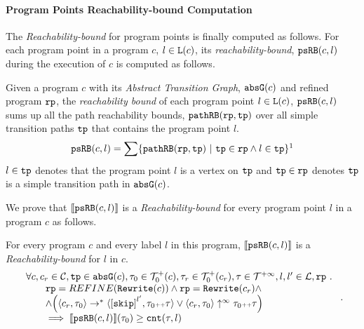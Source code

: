 \paragraph{Program Points Reachability-bound Computation}
\label{sec:point-psrb}
The \emph{Reachability-bound} for program points is finally computed as follows.
For each program point in a program $c$, $l \in \mathtt{L}(c)$,
its \emph{reachability-bound}, $\mathtt{psRB}(c, l)$ during the execution of $c$ is computed as follows.
%
\begin{defn}
\label{def:point_psrb}
Given a program $c$ with its \emph{Abstract Transition Graph}, $\mathtt{abs}{\mathtt{G}}(c)$ and refined program $\mathtt{rp}$,
the \emph{reachability bound} of each program point $l \in \mathtt{L}(c)$, $\mathtt{psRB}(c, l)$ 
sums up all the path reachability bounds, $\mathtt{pathRB}(\mathtt{rp}, \mathtt{tp})$ over all simple transition paths $\mathtt{tp}$ that contains the program point $l$.
\[ 
  \psRB(c, l) = 
  \sum
  \left\{ \inoutB(\rprog, \tpath) ~\vert~ \tpath \in \rprog \land 
  l \in \tpath \right\}\footnotemark
\]
$l \in \mathtt{tp}$ denotes that the program point $l$ is a vertex on $\mathtt{tp}$ 
and $\mathtt{tp} \in \mathtt{rp}$ denotes $\mathtt{tp}$ is a simple transition path in $\mathtt{abs}{\mathtt{G}}(c)$.
\end{defn}
We prove that $\llbracket \mathtt{psRB}(c, l) \rrbracket$ is a \emph{Reachability-bound} for every program point $l$ in a program $c$ as follows.
\begin{thm}
\label{thm:pathsensitive_rb_soundness}
For every program ${c}$ and every label $l$ in this program,
$\llbracket \mathtt{psRB}(c, l) \rrbracket$ is a \emph{Reachability-bound} for $l$ in $c$.
%
\[
  \begin{array}{l}
    \forall c, c_r \in \cdom, \tpath \in \absG(c), \trace_0 \in \ftdom_0(c),  \trace_r \in \ftdom_0(c_r), \trace \in \tdom, l, l' \in \ldom, \rprog \st 
    \\ \qquad
    \rprog = REFINE(\algrewrite(c))
    \land 
    \rprog = \algrewrite(c_r)
    \land
    \\ \qquad
    \land
    \Big(
    \config{c_r, \trace_0} \rightarrow^* \config{\clabel{\eskip}^{l'}, \trace_0 \tracecat \trace}
    \lor \config{c_r, \trace_0} \uparrow^{\infty} \trace_0 \tracecat \trace 
    \Big)
    \\ \qquad
    \implies \econfig{\psRB(c, l)}(\trace_0) \geq \counter(\trace, l)
  \end{array}.
\]
\end{thm}